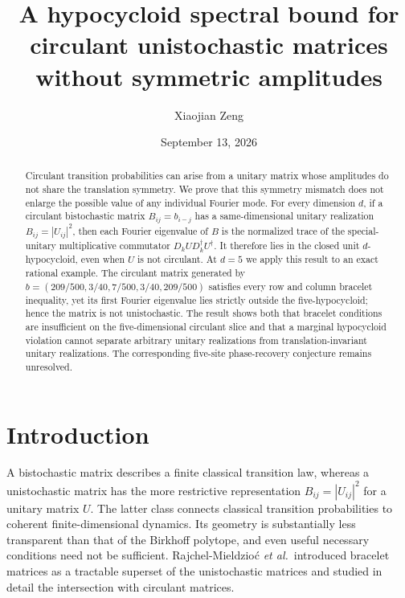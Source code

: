 \documentclass[aip,jmp,preprint,onecolumn,nofootinbib]{revtex4-2}
\begin{document}
\title{A hypocycloid spectral bound for circulant unistochastic matrices without symmetric amplitudes}

\author{Xiaojian Zeng}

\date{September 13, 2026}

\begin{abstract}
Circulant transition probabilities can arise from a unitary matrix whose
amplitudes do not share the translation symmetry.  We prove that this symmetry
mismatch does not enlarge the possible value of any individual Fourier mode.
For every dimension $d$, if a circulant bistochastic matrix
$B_{ij}=b_{i-j}$ has a same-dimensional unitary realization
$B_{ij}=|U_{ij}|^2$, then each Fourier eigenvalue of $B$ is the normalized
trace of the special-unitary multiplicative commutator
$D_kUD_k^\dagger U^\dagger$.  It therefore lies in the closed unit
$d$-hypocycloid, even when $U$ is not circulant.  At $d=5$ we apply this result
to an exact rational example.  The circulant matrix generated by
$b=(209/500,3/40,7/500,3/40,209/500)$ satisfies every row and column bracelet
inequality, yet its first Fourier eigenvalue lies strictly outside the
five-hypocycloid; hence the matrix is not unistochastic.  The result shows both
that bracelet conditions are insufficient on the five-dimensional circulant
slice and that a marginal hypocycloid violation cannot separate arbitrary
unitary realizations from translation-invariant unitary realizations.  The
corresponding five-site phase-recovery conjecture remains unresolved.
\end{abstract}

\maketitle

\section{Introduction}

A bistochastic matrix describes a finite classical transition law, whereas a
unistochastic matrix has the more restrictive representation
$B_{ij}=|U_{ij}|^2$ for a unitary matrix $U$.  The latter class connects
classical transition probabilities to coherent finite-dimensional dynamics.
Its geometry is substantially less transparent than that of the Birkhoff
polytope, and even useful necessary conditions need not be sufficient.
Rajchel-Mieldzio{\'c} \emph{et al.}\ introduced bracelet matrices as a tractable
superset of the unistochastic matrices and studied in detail the intersection
with circulant matrices.\cite{RajchelMieldzioc2022}
\end{document}
